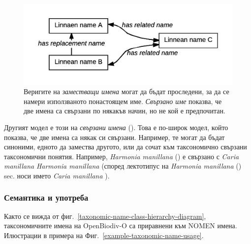 \begin{figure}[h!]
 \centering
  \includegraphics[width=\textwidth]{Figures/scientific-name-patterns}
  \decoRule
  \caption[Scientific name patterns diagram.]{
  Веригите на \emph {заместващи имена} могат да бъдат проследени, за да се намери използваното понастоящем име. \emph{Свързано име} показва, че две имена са свързани по някакъв начин, но не кой е предпочитан.}
  \label{scientific-name-patterns}
\end{figure}

Другият модел е този на \emph{свързани имена} (). Това е по-широк модел, който показва, че две имена са някак си свързани. Например, те могат да бъдат синоними, едното да замества другото, или да сочат към таксономично свързани таксономични понятия. Например, \emph{Harmonia manillana} (\cite{mulsant_monographie_1866}) е свързано с \emph{Caria manillana} \cite {mulsant_monographie_1866} \emph{Harmonia manillana} (според \cite{poorani_harmonia_2016} лектотипус на \emph{Harmonia manillana} (\cite{mulsant_monographie_1866}) sec. \cite{poorani_harmonia_2016} носи името \emph{Caria manillana} \cite{mulsant_monographie_1866}).

\subsubsection{Семантика и употреба}

Както се вижда от фиг.~\ref{taxonomic-name-class-hierarchy-diagram}, таксономичните имена на OpenBiodiv-O са приравнени към NOMEN имена. Илюстрации в примера на Фиг.~\ref{example-taxonomic-name-usage}.

